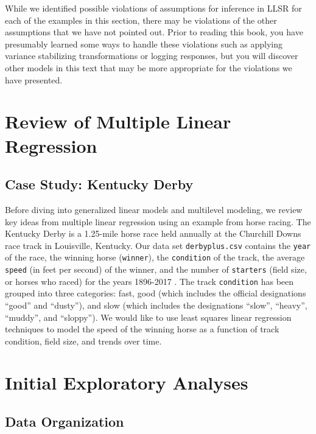 \documentclass[
]{krantz}
\begin{document}
While we identified possible violations of assumptions for inference in LLSR for each of the examples in this section, there may be violations of the other assumptions that we have not pointed out. Prior to reading this book, you have presumably learned some ways to handle these violations such as applying variance stabilizing transformations or logging responses, but you will discover other models in this text that may be more appropriate for the violations we have presented.

\hypertarget{review-of-multiple-linear-regression}{%
\section{Review of Multiple Linear Regression}\label{review-of-multiple-linear-regression}}

\hypertarget{cs:derby}{%
\subsection{Case Study: Kentucky Derby}\label{cs:derby}}

Before diving into generalized linear models and multilevel modeling, we review key ideas from multiple linear regression using an example from horse racing. The Kentucky Derby is a 1.25-mile horse race held annually at the Churchill Downs race track in Louisville, Kentucky. Our data set \texttt{derbyplus.csv} contains the \texttt{year} of the race, the winning horse (\texttt{winner}), the \texttt{condition} of the track, the average \texttt{speed} (in feet per second) of the winner, and the number of \texttt{starters} (field size, or horses who raced) for the years 1896-2017 \citep{KentuckyDerby}. The track \texttt{condition} has been grouped into three categories: fast, good (which includes the official designations ``good'' and ``dusty''), and slow (which includes the designations ``slow'', ``heavy'', ``muddy'', and ``sloppy''). We would like to use least squares linear regression techniques to model the speed of the winning horse as a function of track condition, field size, and trends over time.

\hypertarget{explorech1}{%
\section{Initial Exploratory Analyses}\label{explorech1}}

\hypertarget{data-organization}{%
\subsection{Data Organization}\label{data-organization}}
\end{document}
